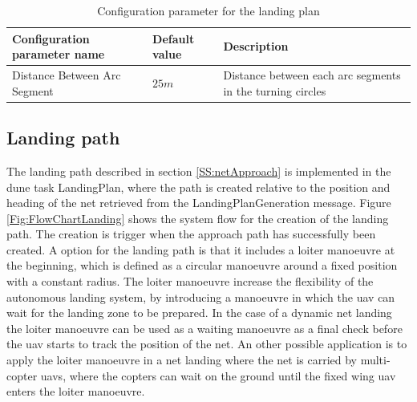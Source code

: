 \begin{table}
\centering
\begin{tabular}{| p{5cm} | p{1cm} | p{5cm} |}
\hline
\textbf{Configuration parameter name}	& \textbf{Default value}	& \textbf{Description} \\ \hline
Distance Between Arc Segment			& $ 25 m$					& Distance between each arc segments in the turning circles \\ \hline
\end{tabular}
\caption{Configuration parameter for the landing plan}
\label{Tb:LandingPlanParameter}
\end{table}
\subsection{Landing path}
The landing path described in section \ref{SS:netApproach} is implemented in the \gls{dune} task LandingPlan, where the path is created relative to the position and heading of the net retrieved from the LandingPlanGeneration message. Figure \ref{Fig:FlowChartLanding} shows the system flow for the creation of the landing path. The creation is trigger when the approach path has successfully been created. A option for the landing path is that it includes a loiter manoeuvre at the beginning, which is defined as a circular manoeuvre around a fixed position with a constant radius. The loiter manoeuvre increase the flexibility of the autonomous landing system, by introducing a manoeuvre in which the \gls{uav} can wait for the landing zone to be prepared. In the case of a dynamic net landing the loiter manoeuvre can be used as a waiting manoeuvre as a final check before the \gls{uav} starts to track the position of the net. An other possible application is to apply the loiter manoeuvre in a net landing where the net is carried by multi-copter \glspl{uav}, where the copters can wait on the ground until the fixed wing \gls{uav} enters the loiter manoeuvre.
\newpage
